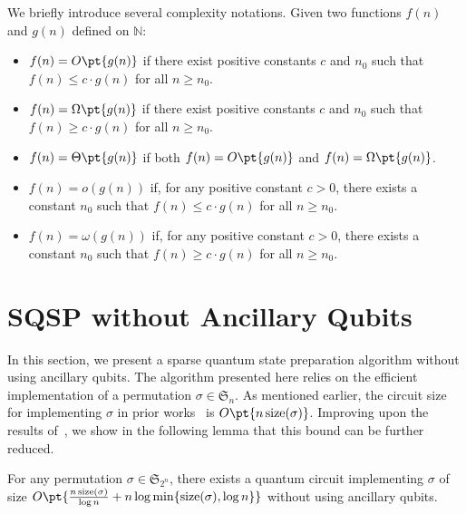 \documentclass[a4paper,UKenglish,cleveref, autoref, thm-restate]{lipics-v2021}
\DeclarePairedDelimiter\cbra{\{}{\}}
\newcommand{\bo}{O\pt}
\newcommand{\om}{\Omega\pt}
\newcommand{\ta}{\Theta\pt}
\begin{document}
We briefly introduce several complexity notations. Given two functions $f(n) $ and $g(n) $ defined on $\mathbb{N}$:
\begin{itemize}
   \item $f(n) = \bo{g(n)} $ if there exist positive constants $c $ and $n_0$ such that $f(n) \leq c \cdot g(n) $ for all $n \geq n_0 $.  
   \item $f(n) = \om{g(n)} $ if there exist positive constants $c $ and $n_0$ such that $f(n) \geq c \cdot g(n) $ for all $n \geq n_0$.  
   \item $f(n) = \ta{g(n)} $ if both $f(n) = \bo{g(n)} $ and $f(n) = \om{g(n)} $.
     \item $f(n) = o(g(n))$ if, for any positive constant $ c > 0 $, there exists a constant $ n_0 $ such that $f(n) \leq c \cdot g(n)$ for all $n \geq n_0$.
    \item $f(n) = \omega(g(n))$ if, for any positive constant $ c > 0 $, there exists a constant $ n_0 $ such that $f(n) \geq c \cdot g(n)$ for all $n \geq n_0$.
\end{itemize}




\section{SQSP without Ancillary Qubits}\label{sec:without}

In this section, we present a sparse quantum state preparation algorithm without using ancillary qubits. The algorithm presented here relies on the efficient  implementation of a permutation $\sigma \in \mathfrak{S}_n$. 
As mentioned earlier, the circuit size for implementing $\sigma$ in prior works~\cite{malvetti2021quantum, ramacciotti2023simple} is $\bo{n\,\mathrm{size}(\sigma)}$. Improving upon the results of~\cite{zakablukov2017asymptotic, li2023asymptotically}, we show in the following lemma that this bound can be further reduced.

\begin{lemma}\label{lemma:sigma-restate}
For any permutation $\sigma \in \mathfrak{S}_{2^n}$, there exists a quantum circuit implementing $\sigma$ of size $\bo{\frac{n\,\mathrm{size}(\sigma)}{\log n} + n\log\min\cbra{\mathrm{size}(\sigma), \log n}}$ without using ancillary qubits. 

\end{lemma}
\end{document}
